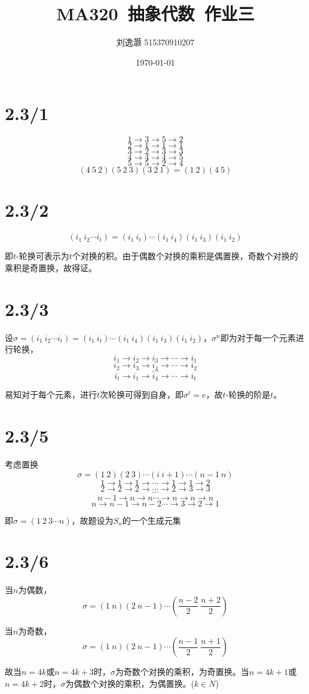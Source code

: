 \documentclass{article}
\title{MA320\ 抽象代数\ 作业三}
\author{刘逸灏 515370910207}
\date{\today}
\begin{document}
\maketitle

\section{2.3/1}
$$1\to3\to5\to2$$
$$2\to1\to1\to1$$
$$3\to2\to3\to3$$
$$4\to4\to4\to5$$
$$5\to5\to2\to4$$
$$(4\ 5\ 2)(5\ 2\ 3)(3\ 2\ 1)=(1\ 2)(4\ 5)$$

\section{2.3/2}
$$(i_1\ i_2\cdots i_t)=(i_1\ i_t)\cdots(i_1\ i_4)(i_1\ i_3)(i_1\ i_2)$$

即$t$-轮换可表示为$t$个对换的积。由于偶数个对换的乘积是偶置换，奇数个对换的乘积是奇置换，故得证。

\section{2.3/3}
设$\sigma=(i_1\ i_2\cdots i_t)=(i_1\ i_t)\cdots(i_1\ i_4)(i_1\ i_3)(i_1\ i_2)$，$\sigma^n$即为对于每一个元素进行轮换，
$$i_1\to i_2\to i_3\to\cdots\to i_1$$
$$i_2\to i_3\to i_4\to\cdots\to i_2$$
$$\cdots$$
$$i_t\to i_1\to i_4\to\cdots\to i_t$$

易知对于每个元素，进行$t$次轮换可得到自身，即$\sigma^t=e$，故$t$-轮换的阶是$t$。

\section{2.3/5}
考虑置换
$$\sigma=(1\ 2)(2\ 3)\cdots(i\ i+1)\cdots(n-1\ n)$$
$$1\to1\to1\to\cdots\to1\to1\to2$$
$$2\to2\to2\to\cdots\to2\to3\to3$$
$$\cdots$$
$$n-1\to n\to n\cdots\to n\to n\to n$$
$$n\to n-1\to n-2\cdots\to 3\to 2\to 1$$

即$\sigma=(1\ 2\ 3\cdots n)$，故题设为$S_n$的一个生成元集

\section{2.3/6}
当$n$为偶数，$$\sigma=(1\ n)(2\ n-1)\cdots(\frac{n-2}{2}\ \frac{n+2}{2})$$

当$n$为奇数，$$\sigma=(1\ n)(2\ n-1)\cdots(\frac{n-1}{2}\ \frac{n+1}{2})$$

故当$n=4k$或$n=4k+3$时，$\sigma$为奇数个对换的乘积，为奇置换。当$n=4k+1$或$n=4k+2$时，$\sigma$为偶数个对换的乘积，为偶置换。($k\in N$)
\end{document}
